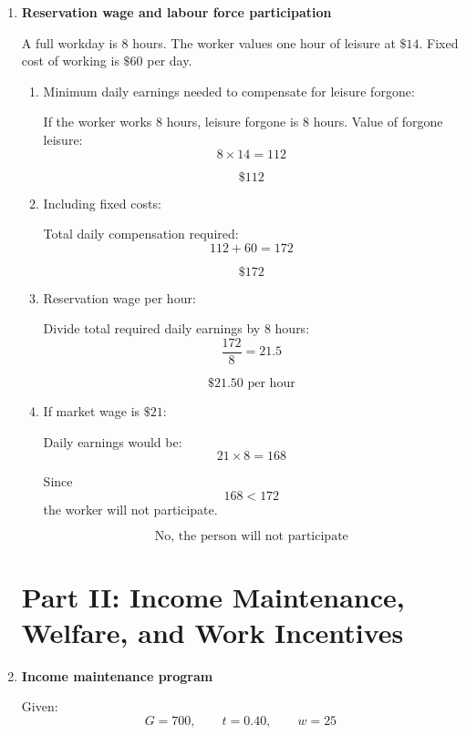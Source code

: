 \documentclass[12pt]{article}
\begin{document}
\begin{enumerate}

\item \textbf{Reservation wage and labour force participation}

A full workday is 8 hours. The worker values one hour of leisure at \(\$14\). Fixed cost of working is \(\$60\) per day.

\begin{enumerate}[label=(\alph*)]
    \item Minimum daily earnings needed to compensate for leisure forgone:

    If the worker works 8 hours, leisure forgone is 8 hours. Value of forgone leisure:
    \[
    8\times 14=112
    \]

    \[
    \boxed{\$112}
    \]

    \item Including fixed costs:

    Total daily compensation required:
    \[
    112+60=172
    \]

    \[
    \boxed{\$172}
    \]

    \item Reservation wage per hour:

    Divide total required daily earnings by 8 hours:
    \[
    \frac{172}{8}=21.5
    \]

    \[
    \boxed{\$21.50 \text{ per hour}}
    \]

    \item If market wage is \(\$21\):

    Daily earnings would be:
    \[
    21\times 8=168
    \]

    Since
    \[
    168<172
    \]
    the worker will not participate.

    \[
    \boxed{\text{No, the person will not participate}}
    \]
\end{enumerate}

\section*{Part II: Income Maintenance, Welfare, and Work Incentives}

\item \textbf{Income maintenance program}

Given:
\[
G=700,\qquad t=0.40,\qquad w=25
\]


\end{enumerate}
\end{document}
